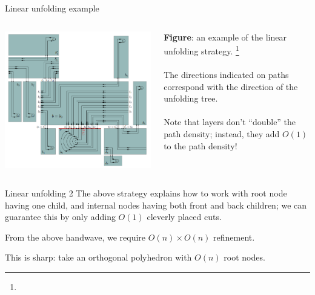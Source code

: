 \documentclass{beamer}
\theoremstyle{plain}
\begin{document}
\begin{frame}{Linear unfolding example}
  \begin{columns}
    \begin{column}{.7\textwidth}
      \includegraphics[height=.8\textheight]{./figs/Linear_unfolding.png}
    \end{column}
    \begin{column}{.3\textwidth}
      \footnotesize \textbf{Figure}: an example of the linear unfolding strategy.
      \footnote[frame]{}\\
      \;\\
      The directions indicated on paths correspond with the direction of the unfolding tree.\\
      \;\\
      Note that layers don't ``double'' the path density; instead, they add $O(1)$ to the path density!
    \end{column}
  \end{columns}
\end{frame}

\begin{frame}{Linear unfolding 2}
  The above strategy explains how to work with root node having one child, and internal nodes having both front and back children;
  we can guarantee this by only adding $O(1)$ cleverly placed cuts.

  \pause From the above handwave, we require $O(n) \times O(n)$ refinement.
  
  \pause This is sharp:
  take an orthogonal polyhedron with $O(n)$ root nodes.
\end{frame}
\end{document}
